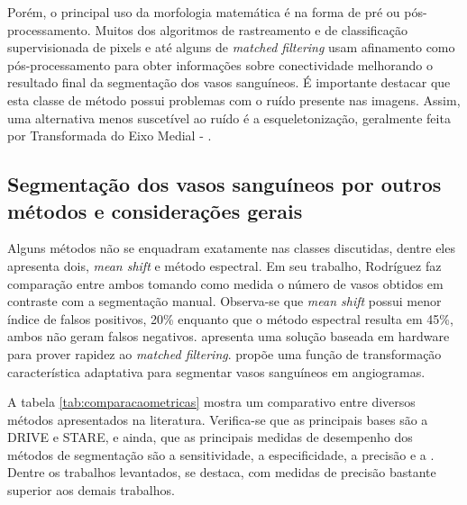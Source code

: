 Porém, o principal uso da morfologia matemática é na forma de pré ou pós-processamento. Muitos dos algoritmos de rastreamento e de classificação supervisionada de pixels e até alguns de \textit{matched filtering} usam afinamento  como pós-processamento para obter informações sobre conectividade melhorando o resultado final da segmentação dos vasos sanguíneos. É importante destacar que esta classe de método possui problemas com o ruído presente nas imagens. Assim, uma alternativa menos suscetível ao ruído  é  a esqueletonização, geralmente feita por Transformada do Eixo Medial -  \cite{Cristiane}. 

\subsection{Segmentação dos vasos sanguíneos por outros métodos e considerações gerais}

Alguns métodos não se enquadram exatamente nas classes discutidas, dentre eles  apresenta dois, \textit{mean shift} e método espectral. Em seu trabalho, Rodríguez faz comparação entre ambos tomando como medida o número de vasos obtidos em contraste com a segmentação manual. Observa-se que \textit{mean shift} possui menor índice de falsos positivos, 20\% enquanto que o método espectral resulta em 45\%, ambos não geram falsos negativos.  apresenta uma solução baseada em hardware para prover rapidez ao \textit{matched filtering}.  propõe uma função de transformação característica adaptativa para segmentar vasos sanguíneos em angiogramas. 

A tabela \ref{tab:comparacaometricas} mostra um comparativo entre diversos métodos apresentados na literatura. Verifica-se que as principais bases são a DRIVE e STARE, e ainda, que as principais medidas de desempenho dos métodos de segmentação são a sensitividade, a especificidade, a precisão e a . Dentre os trabalhos levantados,  se destaca, com medidas de precisão bastante superior aos demais trabalhos. 

